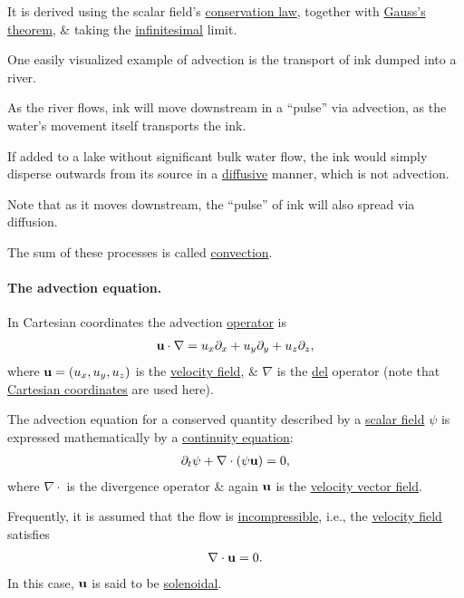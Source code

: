\documentclass{article}
\begin{document}
It is derived using the scalar field's \href{https://en.wikipedia.org/wiki/Conservation_law}{conservation law}, together with \href{https://en.wikipedia.org/wiki/Gauss's_theorem}{Gauss's theorem}, \& taking the \href{https://en.wikipedia.org/wiki/Infinitesimal}{infinitesimal} limit.

%
One easily visualized example of advection is the transport of ink dumped into a river.

As the river flows, ink will move downstream in a ``pulse'' via advection, as the water's movement itself transports the ink.

If added to a lake without significant bulk water flow, the ink would simply disperse outwards from its source in a \href{https://en.wikipedia.org/wiki/Diffusion}{diffusive} manner, which is not advection.

Note that as it moves downstream, the ``pulse'' of ink will also spread via diffusion.

The sum of these processes is called \href{https://en.wikipedia.org/wiki/Convection}{convection}.

\paragraph{The advection equation.} In Cartesian coordinates the advection \href{https://en.wikipedia.org/wiki/Operator_(mathematics)}{operator} is
\begin{align*}
	{\bf u}\cdot\nabla = u_x\partial_x + u_y\partial_y + u_z\partial_z,
\end{align*}
where ${\bf u} = (u_x,u_y,u_z)$ is the \href{https://en.wikipedia.org/wiki/Velocity_field}{velocity field}, \& $\nabla$ is the \href{https://en.wikipedia.org/wiki/Del}{del} operator (note that \href{https://en.wikipedia.org/wiki/Cartesian_coordinate_system}{Cartesian coordinates} are used here).

%
The advection equation for a conserved quantity described by a \href{https://en.wikipedia.org/wiki/Scalar_field}{scalar field} $\psi$ is expressed mathematically by a \href{https://en.wikipedia.org/wiki/Continuity_equation}{continuity equation}:
\begin{align*}
	\partial_t\psi + \nabla\cdot\left(\psi{\bf u}\right) = 0,
\end{align*}
where $\nabla\cdot$  is the divergence operator \& again ${\bf u}$ is the \href{https://en.wikipedia.org/wiki/Velocity_field}{velocity vector field}.

Frequently, it is assumed that the flow is \href{https://en.wikipedia.org/wiki/Incompressible_flow}{incompressible}, i.e., the \href{https://en.wikipedia.org/wiki/Velocity_field}{velocity field} satisfies 
\begin{align*}
	\nabla\cdot{\bf u} = 0.
\end{align*}
In this case, ${\bf u}$ is said to be \href{https://en.wikipedia.org/wiki/Solenoidal}{solenoidal}.
\end{document}
